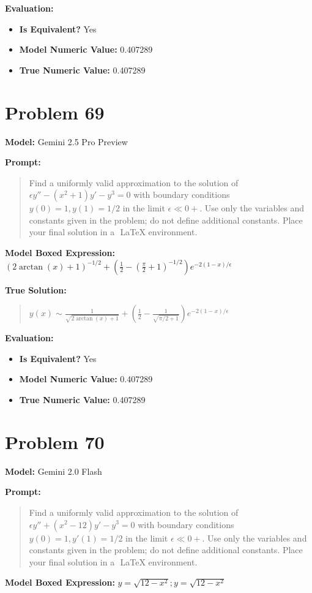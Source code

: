 \documentclass{article}
\begin{document}
{\textbf{Evaluation:}
\begin{itemize}
\item \textbf{Is Equivalent?} Yes
\item \textbf{Model Numeric Value:} 0.407289
\item \textbf{True Numeric Value:} 0.407289
\end{itemize}
\vspace{1cm}
\section*{Problem 69}
\textbf{Model:} Gemini 2.5 Pro Preview

\textbf{Prompt:}
\begin{quote}
Find a uniformly valid approximation to the solution of $\epsilon y'' - (x^2+1)y' - y^3 = 0$ with boundary conditions $y(0)=1, y(1)=1/2$ in the limit $\epsilon \ll 0+$. Use only the variables and constants given in the problem; do not define additional constants. Place your final solution in a $\boxed{}$ LaTeX environment.
\end{quote}
\textbf{Model Boxed Expression:} $ (2\arctan(x)+1)^{-1/2} + \left(\frac{1}{2} - \left(\frac{\pi}{2}+1\right)^{-1/2}\right)e^{-2(1-x)/\epsilon} $

\textbf{True Solution:}
\begin{quote}
$y(x) \sim \frac{1}{\sqrt{2\arctan(x) + 1}} + \left( \frac{1}{2} - \frac{1}{\sqrt{\pi/2 + 1}} \right) e^{-2(1-x)/\epsilon}$
\end{quote}

\textbf{Evaluation:}
\begin{itemize}
\item \textbf{Is Equivalent?} Yes
\item \textbf{Model Numeric Value:} 0.407289
\item \textbf{True Numeric Value:} 0.407289
\end{itemize}
\vspace{1cm}
\section*{Problem 70}
\textbf{Model:} Gemini 2.0 Flash

\textbf{Prompt:}
\begin{quote}
Find a uniformly valid approximation to the solution of $\epsilon y'' + (x^2-12)y' - y^3 = 0$ with boundary conditions $y(0)=1, y'(1)=1/2$ in the limit $\epsilon \ll 0+$. Use only the variables and constants given in the problem; do not define additional constants. Place your final solution in a $\boxed{}$ LaTeX environment.
\end{quote}
\textbf{Model Boxed Expression:} $y = \sqrt{12-x^2}; y = \sqrt{12-x^2}$

}
\end{document}
